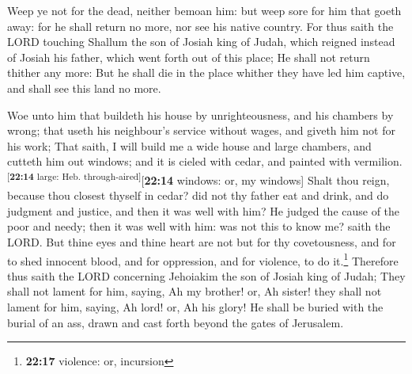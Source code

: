  Weep ye not for the dead, neither bemoan him: but weep
sore for him that goeth away: for he shall return no more, nor see his
native country.  For thus saith the LORD touching Shallum
the son of Josiah king of Judah, which reigned instead of Josiah his
father, which went forth out of this place; He shall not return thither
any more:  But he shall die in the place whither they
have led him captive, and shall see this land no more.

 Woe unto him that buildeth his house by unrighteousness,
and his chambers by wrong; that useth his neighbour's service without
wages, and giveth him not for his work;  That saith, I
will build me a wide house and large chambers, and cutteth him out
windows; and it is cieled with cedar, and painted with
vermilion.\textsuperscript{{[}\textbf{22:14} large: Heb.
through-aired{]}}{[}\textbf{22:14} windows: or, my windows{]}
 Shalt thou reign, because thou closest thyself in cedar?
did not thy father eat and drink, and do judgment and justice, and then
it was well with him?  He judged the cause of the poor
and needy; then it was well with him: was not this to know me? saith the
LORD.  But thine eyes and thine heart are not but for thy
covetousness, and for to shed innocent blood, and for oppression, and
for violence, to do it.\footnote{\textbf{22:17} violence: or, incursion}
 Therefore thus saith the LORD concerning Jehoiakim the
son of Josiah king of Judah; They shall not lament for him, saying, Ah
my brother! or, Ah sister! they shall not lament for him, saying, Ah
lord! or, Ah his glory!  He shall be buried with the
burial of an ass, drawn and cast forth beyond the gates of Jerusalem.


